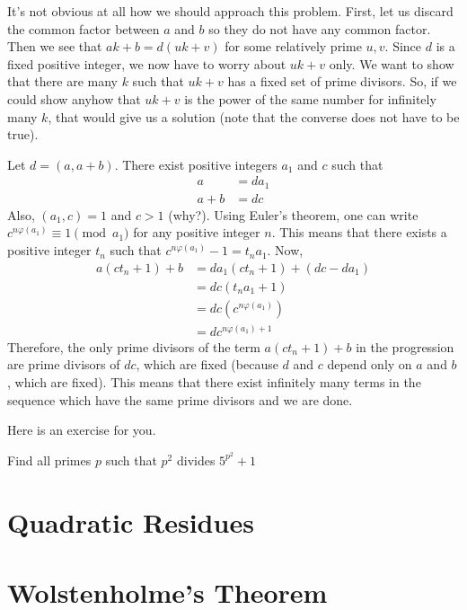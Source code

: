 	\begin{solution}
		It's not obvious at all how we should approach this problem. First, let us discard the common factor between $a$ and $b$ so they do not have any common factor. Then we see that $ak+b=d(uk+v)$ for some relatively prime $u,v$. Since $d$ is a fixed positive integer, we now have to worry about $uk+v$ only. We want to show that there are many $k$ such that $uk+v$ has a fixed set of prime divisors. So, if we could show anyhow that $uk+v$ is the power of the same number for infinitely many $k$, that would give us a solution (note that the converse does not have to be true).

		Let $d=(a, a+b)$. There exist positive integers $a_1$ and $c$ such that
			\begin{align*}
				a
					& =da_1\\
				a+b
					& =dc
			\end{align*}
		Also, $(a_1,c)=1$ and $c >1$ (why?). Using Euler's theorem, one can write $c^{n\varphi(a_1)} \equiv 1 \pmod {a_1}$ for any positive integer $n$. This means that there exists a positive integer $t_n$ such that $c^{n\varphi(a_1)}-1 = t_na_1$. Now,
			\begin{align*}
				a(ct_n+1) + b &= da_1(ct_n+1) + (dc-da_1)\\
					  &= dc(t_na_1 + 1)\\
					  &= dc \left(c^{n\varphi(a_1)}\right)\\
					  &= dc^{n\varphi(a_1)+1}
			\end{align*}
		Therefore, the only prime divisors of the term $a(ct_n+1) + b$ in the progression are prime divisors of $dc$, which are fixed (because $d$ and $c$ depend only on $a$ and $b$, which are fixed). This means that there exist infinitely many terms in the sequence which have the same prime divisors and we are done.
	\end{solution}
Here is an exercise for you.
	\begin{problem}
		Find all primes $p$ such that $p^2$ divides $5^{p^2}+1$
	\end{problem}


\section{Quadratic Residues}\label{sec:qr}
	
\section{Wolstenholme's Theorem}
	
